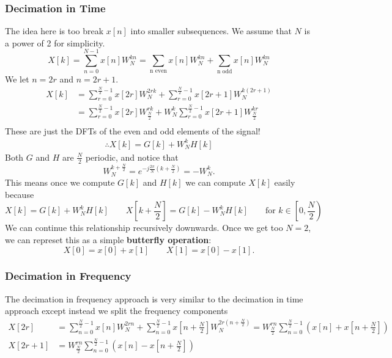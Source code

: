 \subsubsection{Decimation in Time}
The idea here is too break $x[n]$ into smaller subsequences. We assume that $N$ is a power of 2 for simplicity.
\[
  X[k]=\sum_{n=0}^{N-1}x[n]W_N^{kn} = \sum_{\text{n even}}x[n]W_N^{kn}+\sum_{\text{n odd}}x[n]W_N^{kn}
\]
We let $n=2r$ and $n=2r+1$.
\begin{align*}
  X[k] &= \sum_{r=0}^{\frac{N}{2}-1}x[2r]W_N^{2rk}+\sum_{r=0}^{\frac{N}{2}-1}x[2r+1]W_N^{k(2r+1)}\\
  &= \sum_{r=0}^{\frac{N}{2}-1}x[2r]W_{\frac{N}{2}}^{rk}+W_N^k\sum_{r=0}^{\frac{N}{2}-1}x[2r+1]W_{\frac{N}{2}}^{kr}\\
\end{align*}
These are just the DFTs of the even and odd elements of the signal!
\begin{align*}
  \therefore X[k] = G[k] + W_N^kH[k]
\end{align*}
Both $G$ and $H$ are $\frac{N}{2}$ periodic, and notice that
\[
  W_N^{k+\frac{N}{2}}=e^{-j\frac{2\pi}{N}(k+\frac{N}{2})}= -W_N^k.
\]
This means once we compute $G[k]$ and $H[k]$ we can compute $X[k]$ easily because
\[
  X[k] = G[k]+W_N^kH[k]\qquad X\left[k+\frac{N}{2}\right]=G[k]-W_N^kH[k] \qquad \text{for }k\in\left[0, \frac{N}{2}\right)
\]
We can continue this relationship recursively downwards.
Once we get too $N=2$, we can represet this as a simple \textbf{butterfly operation}:
\[
  X[0] = x[0]+x[1] \qquad X[1] = x[0]-x[1].
\]
\subsubsection{Decimation in Frequency}
The decimation in frequency approach is very similar to the decimation in time approach except instead we split the frequency components
\begin{align*}
  X[2r] &= \sum_{n=0}^{\frac{N}{2}-1}x[n]W_N^{2rn}+\sum_{n=0}^{\frac{N}{2}-1}x\left[n+\frac{N}{2}\right]W_N^{2r\left(n+\frac{N}{2}\right)}=W_{\frac{N}{2}}^{rn}\sum_{n=0}^{\frac{N}{2}-1}\left(x[n]+x\left[n+\frac{N}{2}\right]\right)\\
  X[2r+1] &= W_{\frac{N}{2}}^{rn}\sum_{n=0}^{\frac{N}{2}-1}\left(x[n]-x\left[n+\frac{N}{2}\right]\right)
\end{align*}
